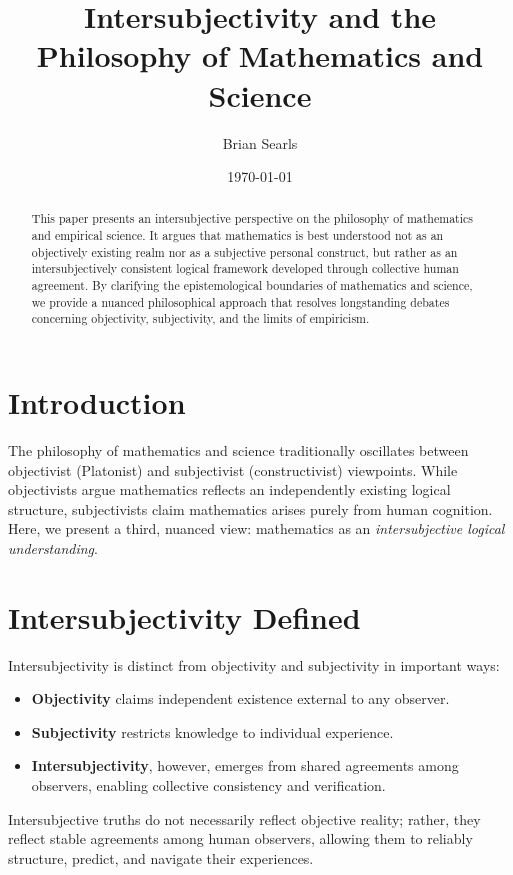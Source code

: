 \documentclass{article}
\title{Intersubjectivity and the Philosophy of Mathematics and Science}
\author{Brian Searls}
\date{\today}
\begin{document}
\maketitle

\begin{abstract}
This paper presents an intersubjective perspective on the philosophy of mathematics and empirical science. It argues that mathematics is best understood not as an objectively existing realm nor as a subjective personal construct, but rather as an intersubjectively consistent logical framework developed through collective human agreement. By clarifying the epistemological boundaries of mathematics and science, we provide a nuanced philosophical approach that resolves longstanding debates concerning objectivity, subjectivity, and the limits of empiricism.
\end{abstract}

\section{Introduction}

The philosophy of mathematics and science traditionally oscillates between objectivist (Platonist) and subjectivist (constructivist) viewpoints. While objectivists argue mathematics reflects an independently existing logical structure, subjectivists claim mathematics arises purely from human cognition. Here, we present a third, nuanced view: mathematics as an \textit{intersubjective logical understanding}.

\section{Intersubjectivity Defined}

Intersubjectivity is distinct from objectivity and subjectivity in important ways:

\begin{itemize}
    \item \textbf{Objectivity} claims independent existence external to any observer.
    \item \textbf{Subjectivity} restricts knowledge to individual experience.
    \item \textbf{Intersubjectivity}, however, emerges from shared agreements among observers, enabling collective consistency and verification.
\end{itemize}

Intersubjective truths do not necessarily reflect objective reality; rather, they reflect stable agreements among human observers, allowing them to reliably structure, predict, and navigate their experiences.
\end{document}
